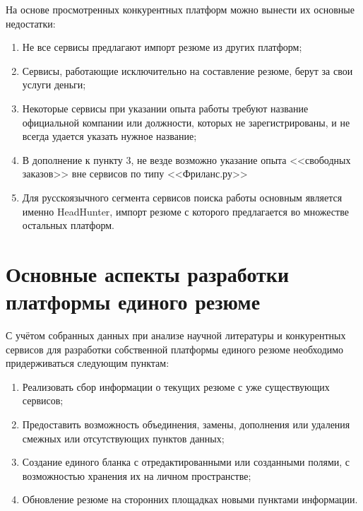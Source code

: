 \documentclass[master, och, pract]{SCWorks}
\begin{document}
На основе просмотренных конкурентных платформ можно вынести их основные недостатки:
\begin{enumerate}
    \item Не все сервисы предлагают импорт резюме из других платформ;
    \item Сервисы, работающие исключительно на составление резюме, берут за свои услуги деньги;
    \item Некоторые сервисы при указании опыта работы требуют название официальной 
    компании или должности, которых не зарегистрированы, 
    и не всегда удается указать нужное название;
    \item В дополнение к пункту 3, не везде возможно указание опыта <<свободных заказов>> 
    вне сервисов по типу <<Фриланс.ру>>
    \item Для русскоязычного сегмента сервисов поиска работы основным является именно 
    HeadHunter, импорт резюме с которого предлагается во множестве остальных платформ.
\end{enumerate}


\section{Основные аспекты разработки платформы единого резюме}
С учётом собранных данных при анализе научной литературы и конкурентных сервисов 
для разработки собственной платформы единого резюме необходимо придерживаться следующим пунктам:
\begin{enumerate}
    \item Реализовать сбор информации о текущих резюме с уже существующих сервисов;
    \item Предоставить возможность объединения, замены, дополнения или удаления 
    смежных или отсутствующих пунктов данных;
    \item Создание единого бланка с отредактированными или созданными полями, 
    с возможностью хранения их на личном пространстве;
    \item Обновление резюме на сторонних площадках новыми пунктами информации.
\end{enumerate}
\end{document}
